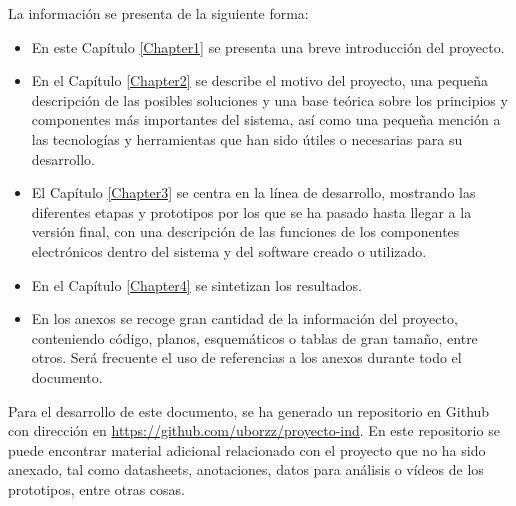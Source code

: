 La información se presenta de la siguiente forma:

\begin{itemize}
  \item En este Capítulo \ref{Chapter1} se presenta una breve introducción del proyecto.
  \item En el Capítulo \ref{Chapter2} se describe el motivo del proyecto, una pequeña descripción de las posibles soluciones y una base teórica sobre los principios y componentes más importantes del sistema, así como una pequeña mención a las tecnologías y herramientas que han sido útiles o necesarias para su desarrollo.
  \item El Capítulo \ref{Chapter3} se centra en la línea de desarrollo, mostrando las diferentes etapas y prototipos por los que se ha pasado hasta llegar a la versión final, con una descripción de las funciones de los componentes electrónicos dentro del sistema y del software creado o utilizado.
  \item En el Capítulo \ref{Chapter4} se sintetizan los resultados.
  \item En los anexos se recoge gran cantidad de la información del proyecto, conteniendo código, planos, esquemáticos o tablas de gran tamaño, entre otros. Será frecuente el uso de referencias a los anexos durante todo el documento.
\end{itemize}

Para el desarrollo de este documento, se ha generado un repositorio en Github con dirección en \url{https://github.com/uborzz/proyecto-ind}. En este repositorio se puede encontrar material adicional relacionado con el proyecto que no ha sido anexado, tal como datasheets, anotaciones, datos para análisis o vídeos de los prototipos, entre otras cosas. 
